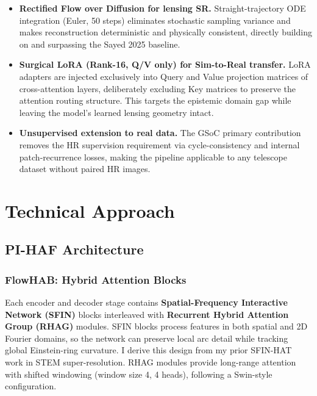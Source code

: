 \documentclass[11pt,a4paper]{article}
\begin{document}
\begin{itemize}
  \item[\textbf{N1.}] \textbf{Rectified Flow over Diffusion for lensing SR.} Straight-trajectory ODE integration (Euler, 50 steps) eliminates stochastic sampling variance and makes reconstruction deterministic and physically consistent, directly building on and surpassing the Sayed 2025 baseline.

  \item[\textbf{N2.}] \textbf{Surgical LoRA (Rank-16, Q/V only) for Sim-to-Real transfer.} LoRA adapters are injected exclusively into Query and Value projection matrices of cross-attention layers, deliberately excluding Key matrices to preserve the attention routing structure. This targets the epistemic domain gap while leaving the model's learned lensing geometry intact.

  \item[\textbf{N3.}] \textbf{Unsupervised extension to real data.} The GSoC primary contribution removes the HR supervision requirement via cycle-consistency and internal patch-recurrence losses, making the pipeline applicable to any telescope dataset without paired HR images.
\end{itemize}

\vspace{6pt}

\section{Technical Approach}

\subsection{PI-HAF Architecture}

\subsubsection{FlowHAB: Hybrid Attention Blocks}

Each encoder and decoder stage contains \textbf{Spatial-Frequency Interactive Network (SFIN)} blocks interleaved with \textbf{Recurrent Hybrid Attention Group (RHAG)} modules. SFIN blocks process features in both spatial and 2D Fourier domains, so the network can preserve local arc detail while tracking global Einstein-ring curvature. I derive this design from my prior SFIN-HAT work in STEM super-resolution. RHAG modules provide long-range attention with shifted windowing (window size 4, 4 heads), following a Swin-style configuration.
\end{document}
